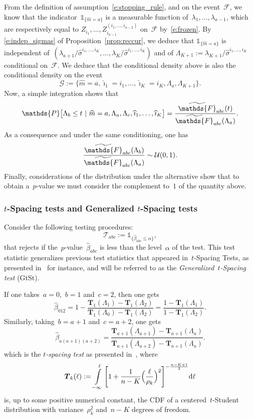 \documentclass[final,numbib]{imaiai}%
\numberwithin{equation}{section}
\def\eq{\begin{equation}}
\def\qe{\end{equation}}
\def\cT{\mathcal{T}}
\def\bT{\boldsymbol{T}}
\def\bbF{\mathds{F}}
\def\bbP{\mathds{P}}
\renewcommand{\hat}{\widehat}
\renewcommand{\tilde}{\widetilde}
\newcommand{\<}{\langle}
\renewcommand{\>}{\rangle}
\newcommand{\1}{\mathds{1}}
\begin{document}
{\noindent From the definition of assumption~\eqref{e:stopping_rule}, and on the event~$\mathcal F$, we know that the indicator~$\1_{\{\hat m=a\}}$ is a measurable function of~$\lambda_1,\ldots, \lambda_{a-1}$, which are respectively equal to $Z_{i_1},\ldots,  Z_{i_{a-1}}^{(i_1,\ldots, i_{a-2})}$ on~$\mathcal F$ by~\eqref{e:frozen}. By \eqref{e:indep_sigmas} of Proposition~\ref{prop:reccur}, we deduce that $\1_{\{\hat m=a\}}$ is independent of~$(\lambda_{a+1}/\hat \sigma^{i_1,\ldots, i_{K}},\ldots,\lambda_K/\hat \sigma^{i_1,\ldots, i_{K}})$ and of $\Lambda_{K+1}:=\lambda_{K+1}/\hat \sigma^{i_1,\ldots, i_{K}}$ conditional on~$\mathcal F$. We deduce that the conditional density above is also the conditional density on the event 
 \[
 \mathcal G:=\big\{\hat m =a,\hat \imath_1 =i_1, \ldots, \hat \imath_{K}=i_{K}, \Lambda_a,\Lambda_{K+1}\big\}.
 \]
Now, a simple integration shows that  
\eq
\label{t_CDF}
\bbP\big[\Lambda_b\leq t\ |\ \hat m =a,\Lambda_a,\Lambda_c, \hat \imath_{1},\ldots,\hat \imath_{K}\big]=\frac{\tilde\bbF_{abc}(t)}{\tilde\bbF_{abc}(\Lambda_a)}.
\qe
As a consequence and under the same conditioning, one has
  \[
  \frac{
  \tilde\bbF_{abc}(\Lambda_b)    }{    \tilde\bbF_{abc}(\Lambda_a)  }  \sim  \mathcal  U(0,1).
  \]
  Finally, considerations of the distribution under the alternative  show that  to obtain a~$p$-value we must consider the complement to~$1$ of  the quantity above.
  
  
 \subsubsection{$t$-Spacing tests and Generalized $t$-Spacing tests}

Consider the following testing procedures:
\eq
\label{zaza66}
\cT_{abc}:=\mathds1_{\{\hat\beta_{abc}\leq\alpha\}},
\qe
that rejects if the~$p$-value~$\hat\beta_{abc}$ is less than the level~$\alpha$ of the test.
This test statistic generalizes previous test statistics that appeared in~$t$-Spacing Tests, as presented in~\cite{azais2018power} for instance, and will be referred to as the {\it Generalized~$t$-Spacing test} (GtSt).

\begin{remark}
\label{rem:tST}
If one takes~$a=0$,~$b=1$ and~$c=2$, then one gets
\[
\hat\beta_{012}=1-\frac{\bT_{1}(\Lambda_1)-\bT_{1}(\Lambda_2)}{\bT_{1}(\Lambda_0)-\bT_{1}(\Lambda_2)}
=\frac{1-\bT_{1}(\Lambda_1)}{1-\bT_{1}(\Lambda_2)}.
\]
Similarly, taking~$b=a+1$ and~$c=a+2$, one gets
\[
\hat\beta_{a(a+1)(a+2)}
=\frac
{\bT_{{a+1}}(\Lambda_{a+1})-\bT_{{a+1}}(\Lambda_a)}
{\bT_{{a+1}}(\Lambda_{a+2})-\bT_{{a+1}}(\Lambda_a)}.
\]
which is the {\it $t$-spacing test} as presented in~\cite{azais2018power}, where 
\eq
\label{e:Student}
\bT_k(\ell):=\int\displaylimits_{-\infty}^\ell\Bigg[1+\frac1{n-K}{\Big(\frac{\ell}{\rho_k}\Big)^2}\Bigg]^{-\frac{{n-K}+1}2}\mathrm d\ell
\qe
is, up to some positive numerical constant, the CDF of a centered~$t$-Student distribution with variance~$\rho_k^2$ and~$n-K$ degrees of freedom.
\end{remark}

}
\end{document}
